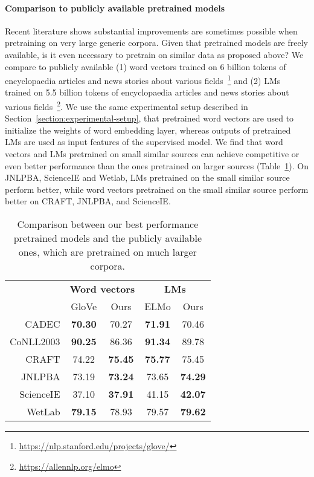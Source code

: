 \documentclass[11pt,a4paper]{article}
\begin{document}
\paragraph{Comparison to publicly available pretrained models}
Recent literature shows substantial improvements are sometimes possible when pretraining on very large generic corpora. 
Given that pretrained models are freely available, is it even necessary to pretrain on similar data as proposed above? 
We compare to publicly available (1) word vectors trained on 6 billion tokens of encyclopaedia articles and news stories about various fields~\footnote{\href{https://nlp.stanford.edu/projects/glove/}{https://nlp.stanford.edu/projects/glove/}} and (2) LMs trained on 5.5 billion tokens of encyclopaedia articles and news stories about various fields~\footnote{\href{https://allennlp.org/elmo}{https://allennlp.org/elmo}}. We use the same experimental setup described in Section~\ref{section:experimental-setup}, that pretrained word vectors are used to initialize the weights of word embedding layer, whereas outputs of pretrained LMs are used as input features of the supervised model.
We find that word vectors and LMs pretrained on small similar sources can achieve competitive or even better performance than the ones pretrained on larger sources (Table~\ref{tab:compare-public}). 
On JNLPBA, ScienceIE and Wetlab, LMs pretrained on the small similar source perform better, while word vectors pretrained on the small similar source perform better on CRAFT, JNLPBA, and ScienceIE.

\begin{table}[tb]
    \centering
    \begin{small}
    \begin{tabular}{r|cc|cc}
    \toprule
     & \multicolumn{2}{c}{\bf Word vectors} & \multicolumn{2}{|c}{\bf LMs} \\
     & GloVe & Ours & ELMo & Ours \\ \midrule
     CADEC & \bf 70.30 & 70.27 & \bf 71.91 & 70.46 \\
     CoNLL2003 & \bf 90.25 & 86.36 & \bf 91.34 & 89.78 \\
     CRAFT & 74.22 & \bf 75.45 & \bf 75.77 & 75.45 \\
     JNLPBA & 73.19 & \bf 73.24 & 73.65 & \bf 74.29 \\
     ScienceIE & 37.10 & \bf 37.91 & 41.15 & \bf 42.07 \\
     WetLab & \bf 79.15 & 78.93 & 79.57 & \bf 79.62 \\
     \bottomrule
     \end{tabular}
     \caption{\label{tab:compare-public}Comparison between our best performance pretrained models and the publicly available ones, which are pretrained on much larger corpora.}
    \end{small}
\end{table}
\end{document}
